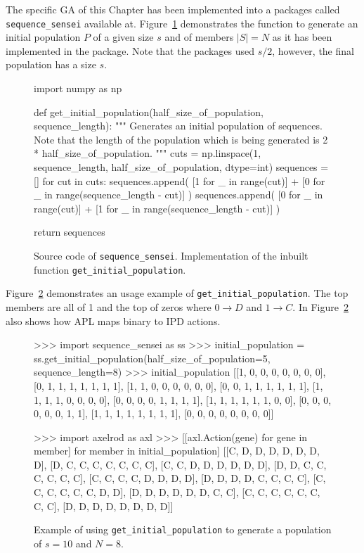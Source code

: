 The specific GA of this Chapter has been implemented into a packages called
\texttt{sequence_sensei} available at.
Figure~\ref{fig:get_initial_population} demonstrates the function to generate
an initial population \(P\) of a given size \(s\) and of members \(|S| = N\) as
it has been implemented in the package. Note that the packages used \(s / 2\),
however, the final population has a size \(s\).

\begin{figure}[!htbp]
\begin{sourcepy}
import numpy as np

def get_initial_population(half_size_of_population, sequence_length):
    """
    Generates an initial population of sequences. Note that the length
    of the population which is being generated is 2 * half_size_of_population.
    """
    cuts = np.linspace(1, sequence_length, half_size_of_population, dtype=int)
    sequences = []
    for cut in cuts:
        sequences.append(
            [1 for _ in range(cut)] + [0 for _ in range(sequence_length - cut)]
        )
        sequences.append(
            [0 for _ in range(cut)] + [1 for _ in range(sequence_length - cut)]
        )

    return sequences
\end{sourcepy}
\caption{Source code of \texttt{sequence_sensei}. Implementation of
the inbuilt function \texttt{get_initial_population}.}\label{fig:get_initial_population}
\end{figure}

Figure~\ref{fig:get_initial_population_example} demonstrates an usage example of
\texttt{get_initial_population}. The top members are all of 1 and
the top of zeros where \(0 \to D\) and \(1 \to C\). In
Figure~\ref{fig:get_initial_population_example} also shows how APL maps
binary to IPD actions.

\begin{figure}[!htbp]
    \begin{usagepy}
>>> import sequence_sensei as ss
>>> initial_population = ss.get_initial_population(half_size_of_population=5, sequence_length=8)
>>> initial_population
[[1, 0, 0, 0, 0, 0, 0, 0],
 [0, 1, 1, 1, 1, 1, 1, 1],
 [1, 1, 0, 0, 0, 0, 0, 0],
 [0, 0, 1, 1, 1, 1, 1, 1],
 [1, 1, 1, 1, 0, 0, 0, 0],
 [0, 0, 0, 0, 1, 1, 1, 1],
 [1, 1, 1, 1, 1, 1, 0, 0],
 [0, 0, 0, 0, 0, 0, 1, 1],
 [1, 1, 1, 1, 1, 1, 1, 1],
 [0, 0, 0, 0, 0, 0, 0, 0]]

 >>> import axelrod as axl
 >>> [[axl.Action(gene) for gene in member] for member in initial_population]
[[C, D, D, D, D, D, D, D],
 [D, C, C, C, C, C, C, C],
 [C, C, D, D, D, D, D, D],
 [D, D, C, C, C, C, C, C],
 [C, C, C, C, D, D, D, D],
 [D, D, D, D, C, C, C, C],
 [C, C, C, C, C, C, D, D],
 [D, D, D, D, D, D, C, C],
 [C, C, C, C, C, C, C, C],
 [D, D, D, D, D, D, D, D]]
    \end{usagepy}
    \caption{Example of using \texttt{get_initial_population} to
    generate a population of \(s=10\) and \(N=8\).}\label{fig:get_initial_population_example}
\end{figure}

